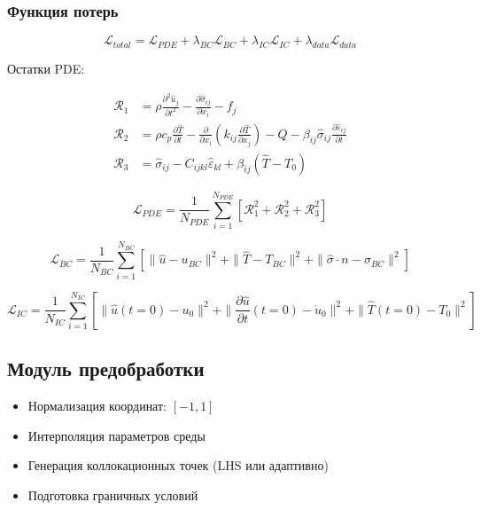 \subsubsection{Функция потерь}

\begin{equation}
\mathcal{L}_{total} = \mathcal{L}_{PDE} + \lambda_{BC}\mathcal{L}_{BC} + \lambda_{IC}\mathcal{L}_{IC} + \lambda_{data}\mathcal{L}_{data}
\end{equation}

Остатки PDE:

\begin{align}
\mathcal{R}_1 &= \rho \frac{\partial^2 \hat{u}_j}{\partial t^2} - \frac{\partial \hat{\sigma}_{ij}}{\partial x_i} - f_j \\
\mathcal{R}_2 &= \rho c_p \frac{\partial \hat{T}}{\partial t} - \frac{\partial}{\partial x_i}\left(k_{ij}\frac{\partial \hat{T}}{\partial x_j}\right) - Q - \beta_{ij}\hat{\sigma}_{ij}\frac{\partial \hat{\varepsilon}_{ij}}{\partial t} \\
\mathcal{R}_3 &= \hat{\sigma}_{ij} - C_{ijkl}\hat{\varepsilon}_{kl} + \beta_{ij}(\hat{T} - T_0)
\end{align}

\begin{equation}
\mathcal{L}_{PDE} = \frac{1}{N_{PDE}} \sum_{i=1}^{N_{PDE}} \left[ \mathcal{R}_1^2 + \mathcal{R}_2^2 + \mathcal{R}_3^2 \right]
\end{equation}

\begin{equation}
\mathcal{L}_{BC} = \frac{1}{N_{BC}} \sum_{i=1}^{N_{BC}} \left[ \|\hat{u} - u_{BC}\|^2 + \|\hat{T} - T_{BC}\|^2 + \|\hat{\sigma} \cdot n - \sigma_{BC}\|^2 \right]
\end{equation}

\begin{equation}
\mathcal{L}_{IC} = \frac{1}{N_{IC}} \sum_{i=1}^{N_{IC}} \left[ \|\hat{u}(t=0) - u_0\|^2 + \|\frac{\partial \hat{u}}{\partial t}(t=0) - \dot{u}_0\|^2 + \|\hat{T}(t=0) - T_0\|^2 \right]
\end{equation}

\subsection{Модуль предобработки}

\begin{itemize}
    \item Нормализация координат: $[-1, 1]$
    \item Интерполяция параметров среды
    \item Генерация коллокационных точек (LHS или адаптивно)
    \item Подготовка граничных условий
\end{itemize}

